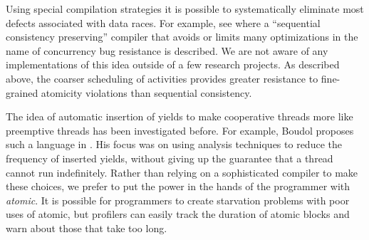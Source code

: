 \documentclass[preprint, 10pt, numbers]{sigplanconf}
\begin{document}
Using special compilation strategies it is possible to systematically eliminate most defects associated with data races.
For example, see \cite{Singh2012} where a ``sequential consistency preserving'' compiler that avoids or limits many optimizations in the name of concurrency bug resistance is described.
We are not aware of any implementations of this idea outside of a few research projects.
As described above, the coarser scheduling of activities provides greater resistance to fine-grained atomicity violations than sequential consistency.

The idea of automatic insertion of yields to make cooperative threads more like preemptive threads has been investigated before.
For example, Boudol proposes such a language in \cite{Boudol2007}.
His focus was on using analysis techniques to reduce the frequency of inserted yields, without giving up the guarantee that a thread cannot run indefinitely.
Rather than relying on a sophisticated compiler to make these choices, we prefer to put the power in the hands of the programmer with \emph{atomic}.
It is possible for programmers to create starvation problems with poor uses of atomic, but profilers can easily track the duration of atomic blocks and warn about those that take too long.




\end{document}
